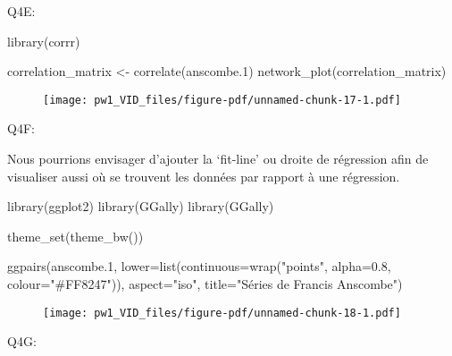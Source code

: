 \documentclass[
  letterpaper,
  DIV=11,
  numbers=noendperiod]{scrartcl}
\newenvironment{Shaded}{}{}
\newcommand{\AttributeTok}[1]{\textcolor[rgb]{0.84,0.23,0.29}{#1}}
\newcommand{\FloatTok}[1]{\textcolor[rgb]{0.00,0.36,0.77}{#1}}
\newcommand{\FunctionTok}[1]{\textcolor[rgb]{0.44,0.26,0.76}{#1}}
\newcommand{\NormalTok}[1]{\textcolor[rgb]{0.14,0.16,0.18}{#1}}
\newcommand{\OtherTok}[1]{\textcolor[rgb]{0.44,0.26,0.76}{#1}}
\newcommand{\StringTok}[1]{\textcolor[rgb]{0.01,0.18,0.38}{#1}}
\begin{document}
Q4E:

\begin{Shaded}
\begin{Highlighting}[]
\FunctionTok{library}\NormalTok{(corrr)}

\NormalTok{correlation\_matrix }\OtherTok{\textless{}{-}} \FunctionTok{correlate}\NormalTok{(anscombe}\FloatTok{.1}\NormalTok{)}
\FunctionTok{network\_plot}\NormalTok{(correlation\_matrix)}
\end{Highlighting}
\end{Shaded}

\begin{figure}[H]

{\centering \texttt{[image: pw1\_VID\_files/figure-pdf/unnamed-chunk-17-1.pdf]}

}

\end{figure}

Q4F:

Nous pourrions envisager d'ajouter la `fit-line' ou droite de régression
afin de visualiser aussi où se trouvent les données par rapport à une
régression.

\begin{Shaded}
\begin{Highlighting}[]
\FunctionTok{library}\NormalTok{(ggplot2)}
\FunctionTok{library}\NormalTok{(GGally)}
\FunctionTok{library}\NormalTok{(GGally)}

\FunctionTok{theme\_set}\NormalTok{(}\FunctionTok{theme\_bw}\NormalTok{())}

\FunctionTok{ggpairs}\NormalTok{(anscombe}\FloatTok{.1}\NormalTok{,}
        \AttributeTok{lower=}\FunctionTok{list}\NormalTok{(}\AttributeTok{continuous=}\FunctionTok{wrap}\NormalTok{(}\StringTok{"points"}\NormalTok{, }\AttributeTok{alpha=}\FloatTok{0.8}\NormalTok{, }\AttributeTok{colour=}\StringTok{"\#FF8247"}\NormalTok{)),}
        \AttributeTok{aspect=}\StringTok{"iso"}\NormalTok{,}
        \AttributeTok{title=}\StringTok{"Séries de Francis Anscombe"}\NormalTok{)}
\end{Highlighting}
\end{Shaded}

\begin{figure}[H]

{\centering \texttt{[image: pw1\_VID\_files/figure-pdf/unnamed-chunk-18-1.pdf]}

}

\end{figure}

Q4G:
\end{document}
